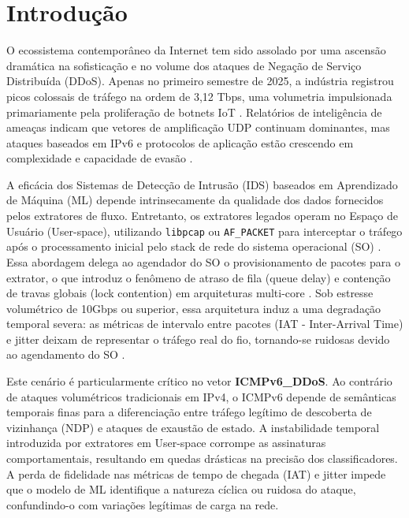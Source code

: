 \documentclass[12pt]{article}
\begin{document}
\section{Introdução}
O ecossistema contemporâneo da Internet tem sido assolado por uma ascensão dramática na sofisticação e no volume dos ataques de Negação de Serviço Distribuída (DDoS). Apenas no primeiro semestre de 2025, a indústria registrou picos colossais de tráfego na ordem de 3,12 Tbps, uma volumetria impulsionada primariamente pela proliferação de botnets IoT \cite{sharafaldin_toward_2018}. Relatórios de inteligência de ameaças indicam que vetores de amplificação UDP continuam dominantes, mas ataques baseados em IPv6 e protocolos de aplicação estão crescendo em complexidade e capacidade de evasão \cite{CNIBM4HF}.

A eficácia dos Sistemas de Detecção de Intrusão (IDS) baseados em Aprendizado de Máquina (ML) depende intrinsecamente da qualidade dos dados fornecidos pelos extratores de fluxo. Entretanto, os extratores legados operam no Espaço de Usuário (User-space), utilizando \texttt{libpcap} ou \texttt{AF\_PACKET} para interceptar o tráfego após o processamento inicial pelo stack de rede do sistema operacional (SO) \cite{lashkari_cicflowmeter-v40_2018}. Essa abordagem delega ao agendador do SO o provisionamento de pacotes para o extrator, o que introduz o fenômeno de atraso de fila (queue delay) e contenção de travas globais (lock contention) em arquiteturas multi-core \cite{BNI4C7TA}. Sob estresse volumétrico de 10Gbps ou superior, essa arquitetura induz a uma degradação temporal severa: as métricas de intervalo entre pacotes (IAT - Inter-Arrival Time) e jitter deixam de representar o tráfego real do fio, tornando-se ruidosas devido ao agendamento do SO \cite{shafi_unveiling_2024}.

Este cenário é particularmente crítico no vetor \textbf{ICMPv6\_DDoS}. Ao contrário de ataques volumétricos tradicionais em IPv4, o ICMPv6 depende de semânticas temporais finas para a diferenciação entre tráfego legítimo de descoberta de vizinhança (NDP) e ataques de exaustão de estado. A instabilidade temporal introduzida por extratores em User-space corrompe as assinaturas comportamentais, resultando em quedas drásticas na precisão dos classificadores. A perda de fidelidade nas métricas de tempo de chegada (IAT) e jitter impede que o modelo de ML identifique a natureza cíclica ou ruidosa do ataque, confundindo-o com variações legítimas de carga na rede.
\end{document}
